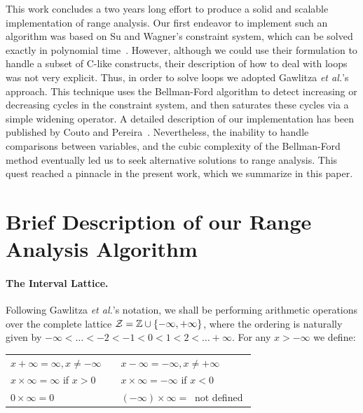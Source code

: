 \documentclass{paper}
\begin{document}
This work concludes a two years long effort to produce a solid and scalable
implementation of range analysis.
Our first endeavor to implement such an algorithm was based on Su and
Wagner's constraint system, which can be solved exactly in polynomial
time~\cite{Su04,Su05}.
However, although we could use their formulation to handle a subset of C-like
constructs, their description of how to deal with loops was
not very explicit.
Thus, in order to solve loops we adopted Gawlitza
{\em et al.}'s~\cite{Gawlitza09} approach.
This technique uses the Bellman-Ford algorithm to detect increasing or
decreasing cycles in the constraint system, and then saturates these cycles
via a simple widening operator.
A detailed description of our implementation has been published by
Couto and Pereira~\cite{Couto11}.
Nevertheless, the inability to handle comparisons between variables, and the
cubic complexity of the Bellman-Ford method eventually led us to seek
alternative solutions to range analysis.
This quest reached a pinnacle in the present work, which we summarize in this
paper.

\section{Brief Description of our Range Analysis Algorithm}
\label{sec:desc}

\paragraph{The Interval Lattice.}
Following Gawlitza {\em et al.}'s notation, we shall be performing arithmetic
operations over the complete lattice
$\cal{Z} = \mathbb{Z} \cup \{-\infty, +\infty\}$, where the ordering is
naturally given by $-\infty < \ldots < -2 < -1 < 0 < 1 < 2 < \ldots +\infty$.
For any $x > -\infty$ we define:

\begin{tabular}{lcl}
$x + \infty = \infty, x \neq -\infty$ & \mbox{\hspace{0.1cm}} & $x - \infty = - \infty, x \neq +\infty$ \\
$x \times \infty = \infty$ if $x > 0$ & & $x \times \infty = -\infty$ if $x < 0$ \\
$0 \times \infty = 0$ & & $(-\infty) \times \infty = \ $ not defined $$ \\
\end{tabular}
\end{document}
